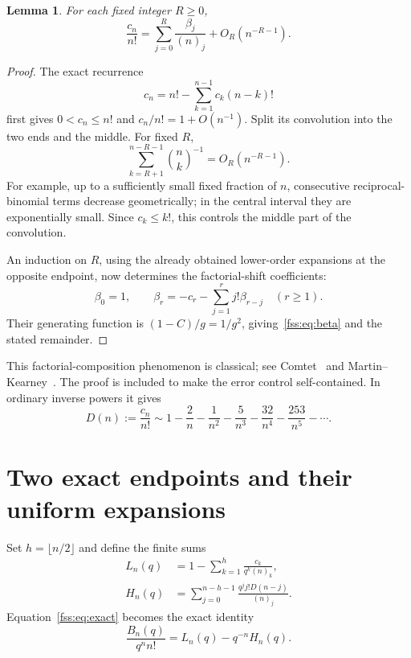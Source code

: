 \documentclass[11pt]{article}
\newtheorem{lemma}[theorem]{Lemma}
\newcommand{\fall}[2]{(#1)_{#2}}
\begin{document}
\begin{lemma}\label{fss:lem:factorial}
For each fixed integer $R\ge0$,
\begin{equation}\label{fss:eq:factorial}
 \frac{c_n}{n!}=\sum_{j=0}^R\frac{\beta_j}{\fall nj}+O_R(n^{-R-1}).
\end{equation}
\end{lemma}
\begin{proof}
The exact recurrence
\[
 c_n=n!-\sum_{k=1}^{n-1}c_k(n-k)!
\]
first gives $0<c_n\le n!$ and $c_n/n!=1+O(n^{-1})$. Split its convolution into the two ends and the middle. For fixed $R$,
\begin{equation}\label{fss:eq:recipbin}
 \sum_{k=R+1}^{n-R-1}\binom nk^{-1}=O_R(n^{-R-1}).
\end{equation}
For example, up to a sufficiently small fixed fraction of $n$, consecutive reciprocal-binomial terms decrease geometrically; in the central interval they are exponentially small. Since $c_k\le k!$, this controls the middle part of the convolution.

An induction on $R$, using the already obtained lower-order expansions at the opposite endpoint, now determines the factorial-shift coefficients:
\[
 \beta_0=1,\qquad
 \beta_r=-c_r-\sum_{j=1}^rj!\beta_{r-j}\quad(r\ge1).
\]
Their generating function is $(1-C)/g=1/g^2$, giving~\eqref{fss:eq:beta} and the stated remainder.
\end{proof}
This factorial-composition phenomenon is classical; see Comtet~\cite{Comtet} and Martin--Kearney~\cite{MK}. The proof is included to make the error control self-contained. In ordinary inverse powers it gives
\begin{equation}\label{fss:eq:Dseries}
 D(n):=\frac{c_n}{n!}\sim1-\frac2n-\frac1{n^2}-\frac5{n^3}
 -\frac{32}{n^4}-\frac{253}{n^5}-\cdots.
\end{equation}

\section{Two exact endpoints and their uniform expansions}\label{fss:sec:endpoints}
Set $h=\lfloor n/2\rfloor$ and define the finite sums
\begin{equation}\label{fss:eq:endpoints}
 \begin{aligned}
 L_n(q)&=1-\sum_{k=1}^h\frac{c_k}{q^k\fall nk},\\
 H_n(q)&=\sum_{j=0}^{n-h-1}\frac{q^j j!D(n-j)}{\fall nj}.
 \end{aligned}
\end{equation}
Equation~\eqref{fss:eq:exact} becomes the exact identity
\begin{equation}\label{fss:eq:twosectors}
 \frac{B_n(q)}{q^n n!}=L_n(q)-q^{-n}H_n(q).
\end{equation}
\end{document}
